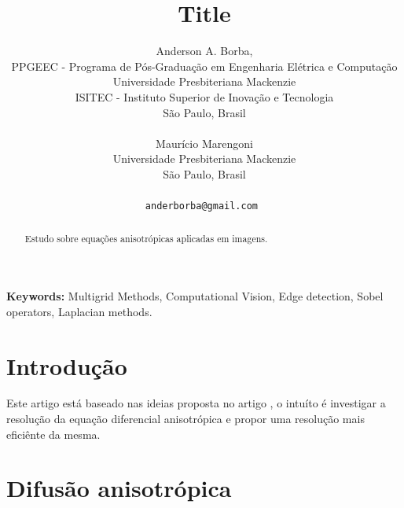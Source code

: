 \documentclass[a4paper]{article} %
\date{} %
\def\keywords#1{{\bf Keywords: }{#1}}
\begin{document}
\thispagestyle{empty}

\title{\textbf{Title}}

\author{Anderson A. Borba, \\ 
         PPGEEC - Programa de Pós-Graduação em Engenharia Elétrica e Computação\\
	 Universidade Presbiteriana Mackenzie\\
	 ISITEC - Instituto Superior de Inovação e Tecnologia\\
         São Paulo, Brasil\\ \\ %
         Maurício Marengoni  \\ %
	 Universidade Presbiteriana Mackenzie\\
         São Paulo, Brasil \\ \\ %
	\tt{anderborba@gmail.com} %
}%

\date{} %
\maketitle\thispagestyle{empty} %


\begin{abstract}
	Estudo sobre equações anisotrópicas aplicadas em imagens.
\end{abstract}

\keywords{Multigrid Methods, Computational Vision, Edge detection, Sobel operators, Laplacian methods.}

\section{Introdução}

Este artigo está baseado nas ideias proposta no artigo \cite{tsiotsios2013anisotropic}, o intuíto é investigar a resolução da equação diferencial anisotrópica e propor uma resolução mais eficiênte da mesma. 

\section{Difusão anisotrópica}
\end{document}
